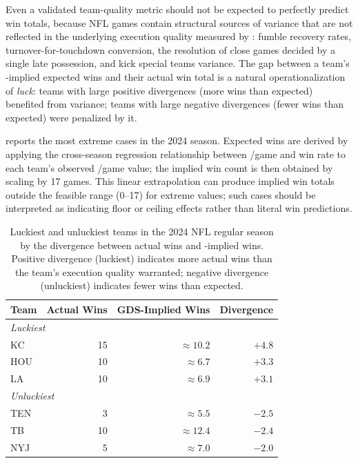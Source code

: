 Even a validated team-quality metric should not be expected to perfectly predict
win totals, because NFL games contain structural sources of variance that are
not reflected in the underlying execution quality measured by \gds{}: fumble
recovery rates, turnover-for-touchdown conversion, the resolution of close
games decided by a single late possession, and kick special teams variance.
The gap between a team's \gds{}-implied expected wins and their actual win total
is a natural operationalization of \emph{luck}: teams with large positive
divergences (more wins than expected) benefited from variance; teams with
large negative divergences (fewer wins than expected) were penalized by it.

 reports the most extreme cases in the 2024 season.
Expected wins are derived by applying the cross-season regression relationship
between \gds{}/game and win rate to each team's observed \gds{}/game value;
the implied win count is then obtained by scaling by 17 games. This linear
extrapolation can produce implied win totals outside the feasible range
(0--17) for extreme \gds{} values; such cases should be interpreted as
indicating floor or ceiling effects rather than literal win predictions.

\begin{table}[htbp]
  \centering
  \caption{Luckiest and unluckiest teams in the 2024 NFL regular season by
           the divergence between actual wins and \gds{}-implied wins.
           Positive divergence (luckiest) indicates more actual wins than
           the team's execution quality warranted; negative divergence
           (unluckiest) indicates fewer wins than expected.}
  \label{tab:luck-analysis}
  \begin{tabular}{lrrr}
    \toprule
    \textbf{Team} & \textbf{Actual Wins} & \textbf{GDS-Implied Wins}
      & \textbf{Divergence} \\
    \midrule
    \multicolumn{4}{l}{\textit{Luckiest}} \\[2pt]
    KC  & 15 & ${\approx}10.2$ & $+4.8$ \\
    HOU & 10 & ${\approx}6.7$  & $+3.3$ \\
    LA  & 10 & ${\approx}6.9$  & $+3.1$ \\[6pt]
    \multicolumn{4}{l}{\textit{Unluckiest}} \\[2pt]
    TEN &  3 & ${\approx}5.5$  & $-2.5$ \\
    TB  & 10 & ${\approx}12.4$ & $-2.4$ \\
    NYJ &  5 & ${\approx}7.0$  & $-2.0$ \\
    \bottomrule
  \end{tabular}
\end{table}


